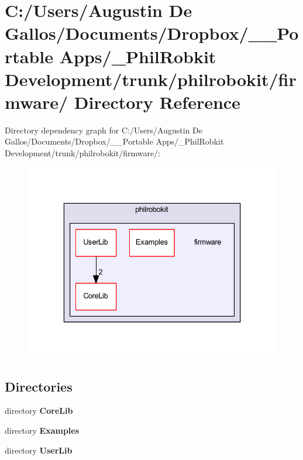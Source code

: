 \section{C\-:/\-Users/\-Augustin De Gallos/\-Documents/\-Dropbox/\-\_\-\-\_\-\-Portable Apps/\-\_\-\-Phil\-Robkit Development/trunk/philrobokit/firmware/ Directory Reference}
\label{dir_2753c5e4e5f46bda0faf5ebc54d31947}
Directory dependency graph for C\-:/\-Users/\-Augustin De Gallos/\-Documents/\-Dropbox/\-\_\-\-\_\-\-Portable Apps/\-\_\-\-Phil\-Robkit Development/trunk/philrobokit/firmware/\-:\nopagebreak
\begin{figure}[H]
\begin{center}
\leavevmode
\includegraphics[width=332pt]{dir_2753c5e4e5f46bda0faf5ebc54d31947_dep}
\end{center}
\end{figure}
\subsection*{Directories}
\begin{DoxyCompactItemize}
\item 
directory {\bf Core\-Lib}
\item 
directory {\bf Examples}
\item 
directory {\bf User\-Lib}
\end{DoxyCompactItemize}
